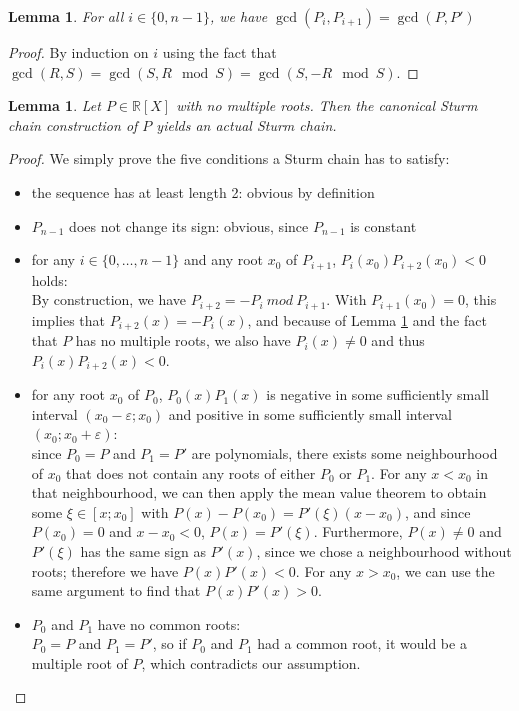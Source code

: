 \documentclass[11pt,a4paper,oneside]{article}
\newtheorem{lemma}[definition]{Lemma}
\newcommand{\RR}{\mathbb{R}}
\renewcommand{\epsilon}{\varepsilon}
\begin{document}
\begin{lemma}\label{thm:sturm_gcd}
For all $i\in\{0,n-1\}$, we have $\gcd(P_i, P_{i+1}) = \gcd(P,P')$\\
\end{lemma}
\begin{proof}
By induction on $i$ using the fact that $\gcd(R,S)=\gcd(S,R\mod S)=\gcd(S,-R\mod S)$.
\end{proof}

\begin{lemma}\label{thm:sturm_seq_canonical}
Let $P\in\RR[X]$ with no multiple roots. Then the canonical Sturm chain construction of $P$ yields an actual Sturm chain.
\end{lemma}
\begin{proof}
We simply prove the five conditions a Sturm chain has to satisfy:
\begin{itemize}
\item the sequence has at least length 2: obvious by definition
\item $P_{n-1}$ does not change its sign: obvious, since $P_{n-1}$ is constant
\item for any $i\in\{0,\ldots,n-1\}$ and any root $x_0$ of $P_{i+1}$, $P_{i}(x_0)P_{i+2}(x_0) < 0$ holds:\\
By construction, we have $P_{i+2} = -P_{i}\ \textit{mod}\ P_{i+1}$. With $P_{i+1}(x_0)=0$, this implies that $P_{i+2}(x) = -P_i(x)$, and because of Lemma \ref{thm:sturm_gcd} and the fact that $P$ has no multiple roots, we also have $P_i(x)\neq 0$ and thus $P_i(x)P_{i+2}(x)<0$.
\item for any root $x_0$ of $P_0$, $P_0(x)P_1(x)$ is negative in some sufficiently small interval $(x_0-\epsilon;x_0)$ and positive in some sufficiently small interval $(x_0;x_0+\epsilon)$:\\
since $P_0=P$ and $P_1=P'$ are polynomials, there exists some neighbourhood of $x_0$ that does not contain any roots of either $P_0$ or $P_1$. For any $x<x_0$ in that neighbourhood, we can then apply the mean value theorem to obtain some $\xi\in[x;x_0]$ with $P(x)-P(x_0) = P'(\xi)(x-x_0)$, and since $P(x_0)=0$ and $x-x_0<0$, $P(x)=P'(\xi)$. Furthermore, $P(x)\neq 0$ and $P'(\xi)$ has the same sign as $P'(x)$, since we chose a neighbourhood without roots; therefore we have $P(x)P'(x)<0$. For any $x>x_0$, we can use the same argument to find that $P(x)P'(x)>0$.
\item $P_0$ and $P_1$ have no common roots:\\
$P_0=P$ and $P_1=P'$, so if $P_0$ and $P_1$ had a common root, it would be a multiple root of $P$, which contradicts our assumption.
\end{itemize}
\end{proof}
\end{document}
